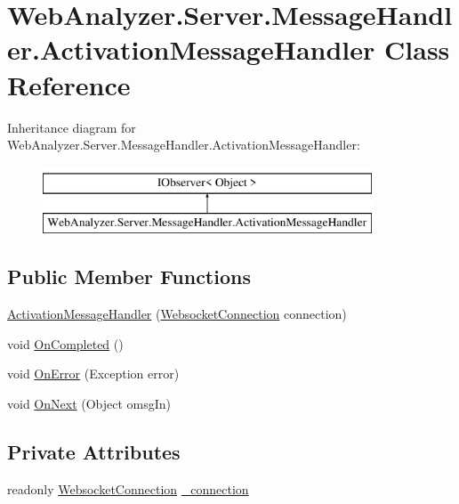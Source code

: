 \hypertarget{class_web_analyzer_1_1_server_1_1_message_handler_1_1_activation_message_handler}{}\section{Web\+Analyzer.\+Server.\+Message\+Handler.\+Activation\+Message\+Handler Class Reference}
\label{class_web_analyzer_1_1_server_1_1_message_handler_1_1_activation_message_handler}
Inheritance diagram for Web\+Analyzer.\+Server.\+Message\+Handler.\+Activation\+Message\+Handler\+:\begin{figure}[H]
\begin{center}
\leavevmode
\includegraphics[height=2.000000cm]{class_web_analyzer_1_1_server_1_1_message_handler_1_1_activation_message_handler}
\end{center}
\end{figure}
\subsection*{Public Member Functions}
\begin{DoxyCompactItemize}
\item 
\hyperlink{class_web_analyzer_1_1_server_1_1_message_handler_1_1_activation_message_handler_aa05ee6b24b05ef071e0f4fe6186f581c}{Activation\+Message\+Handler} (\hyperlink{class_web_analyzer_1_1_server_1_1_websocket_connection}{Websocket\+Connection} connection)
\item 
void \hyperlink{class_web_analyzer_1_1_server_1_1_message_handler_1_1_activation_message_handler_a7a5fa265a93c6f2b3aa97ddc1a1ab018}{On\+Completed} ()
\item 
void \hyperlink{class_web_analyzer_1_1_server_1_1_message_handler_1_1_activation_message_handler_af0709f385ad61869e7f5b3d04d9a5a78}{On\+Error} (Exception error)
\item 
void \hyperlink{class_web_analyzer_1_1_server_1_1_message_handler_1_1_activation_message_handler_a5dc2879ba556e923bb24a7d5cb36d322}{On\+Next} (Object omsg\+In)
\end{DoxyCompactItemize}
\subsection*{Private Attributes}
\begin{DoxyCompactItemize}
\item 
readonly \hyperlink{class_web_analyzer_1_1_server_1_1_websocket_connection}{Websocket\+Connection} \hyperlink{class_web_analyzer_1_1_server_1_1_message_handler_1_1_activation_message_handler_a72e20f23d13fafc255e8e860bfe8f8fa}{\+\_\+connection}
\end{DoxyCompactItemize}


